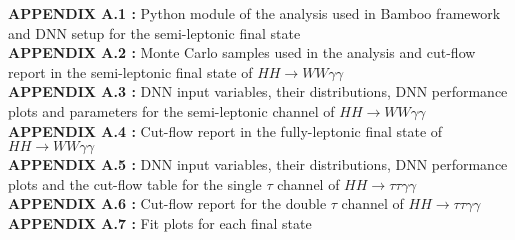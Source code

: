 \singlespacing
\textbf{APPENDIX A.1 :} Python module of the analysis used in Bamboo framework and DNN setup for the \wwgg semi-leptonic final state \\
\textbf{APPENDIX A.2 :} Monte Carlo samples used in the analysis and cut-flow report in the semi-leptonic final state of $HH\rightarrow{WW\gamma\gamma}$ \\
\textbf{APPENDIX A.3 :} DNN input variables, their distributions, DNN performance plots and parameters for the semi-leptonic channel of $HH\rightarrow{WW\gamma\gamma}$\\
\textbf{APPENDIX A.4 :} Cut-flow report in the fully-leptonic final state of $HH\rightarrow{WW\gamma\gamma}$ \\
\textbf{APPENDIX A.5 :} DNN input variables, their distributions, DNN performance plots and the cut-flow table for the single $\tau$ channel of $HH\rightarrow{\tau\tau\gamma\gamma}$ \\
\textbf{APPENDIX A.6 :} Cut-flow report for the double $\tau$ channel of $HH\rightarrow{\tau\tau\gamma\gamma}$ \\
\textbf{APPENDIX A.7 :} Fit plots for each final state \\
\newpage